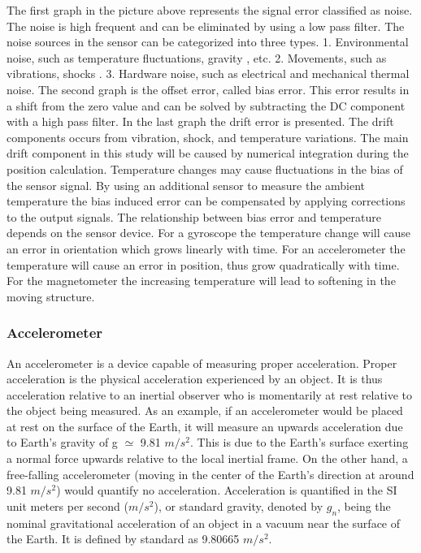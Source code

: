 The first graph in the picture above represents the signal error classified as noise. The noise is high frequent and can be eliminated by using a low pass filter. The noise sources in the sensor can be categorized into three types.
1. Environmental noise, such as temperature fluctuations, gravity , etc.
2. Movements, such as vibrations, shocks .
3. Hardware noise, such as electrical and mechanical thermal noise.
The second graph is the offset error, called bias error. This error results in a shift from the zero value and can be solved by subtracting the DC component with a high pass filter. In the last graph the drift error is presented. The drift components occurs from vibration, shock, and temperature variations. The main drift component in this study will be caused by numerical integration during the position calculation.
Temperature changes may cause fluctuations in the bias of the sensor signal. By using an additional sensor to measure the ambient temperature the bias induced error can be compensated by applying corrections to the output signals. The relationship between bias error and temperature depends on the sensor device. For a gyroscope the temperature change will cause an error in orientation which grows linearly with time. For an accelerometer the temperature will cause an error in position, thus grow quadratically with time. For the magnetometer the increasing temperature will lead to softening in the moving structure.

\subsubsection{Accelerometer}

An accelerometer is a device capable of measuring proper acceleration. Proper acceleration is the physical acceleration experienced by an object. It is thus acceleration relative to an inertial observer who is momentarily at rest relative to the object being measured. As an example, if an accelerometer would be placed at rest on the surface of the Earth, it will measure an upwards acceleration due to Earth's gravity of g $\simeq$ 9.81 $m/s^2$. This is due to the Earth's surface exerting a normal force upwards relative to the local inertial frame. On the other hand, a free-falling accelerometer (moving in the center of the Earth's direction at around 9.81 $m/s^2$) would quantify no acceleration. Acceleration is quantified in the SI unit meters per second ($m/s^2$), or standard gravity, denoted by $g_n$, being the nominal gravitational acceleration of an object in a vacuum near the surface of the Earth. It is defined by standard as 9.80665 $m/s^2$.

